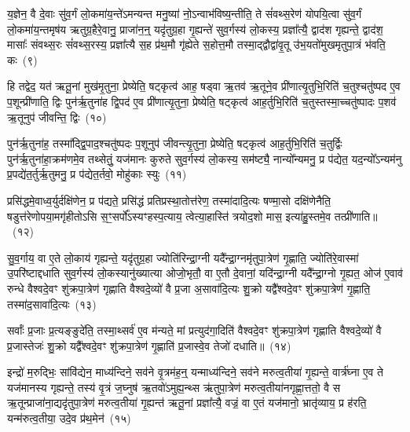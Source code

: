 {\anuvakamend[{ध्रु॒वस्तस्मा॑दे॒व य॒ज्ञस्यैका॒न्नच॑त्वारि॒ꣳ॒शच्च॑}]}

य॒ज्ञेन॒ वै दे॒वाः सु॑व॒र्गं लो॒कमा॑य॒न्ते॑\-ऽमन्यन्त मनु॒ष्या॑ नो॒\-ऽन्वाभ॑विष्य॒न्तीति॒ ते सं॑वथ्स॒रेण॑ योपयि॒त्वा सु॑व॒र्गं लो॒कमा॑य॒न्तमृष॑य ऋतुग्र॒हैरे॒वानु॒ प्राजा॑न॒न्॒ यदृ॑तुग्र॒हा गृ॒ह्यन्ते॑ सुव॒र्गस्य॑ लो॒कस्य॒ प्रज्ञा᳚त्यै॒ द्वाद॑श गृह्यन्ते॒ द्वाद॑श॒ मासाः᳚ संवथ्स॒रः सं॑वथ्स॒रस्य॒ प्रज्ञा᳚त्यै स॒ह प्र॑थ॒मौ गृ॑ह्येते स॒होत्त॒मौ तस्मा॒द्द्वौद्वा॑वृ॒तू उ॑भ॒यतो॑मुखमृतुपा॒त्रं भ॑वति॒ कः~(९)\ip

हि तद्वेद॒ यत॑ ऋतू॒नां मुख॑मृ॒तुना॒ प्रेष्येति॒ षट्कृत्व॑ आह॒ षड्वा ऋ॒तव॑ ऋ॒तूने॒व प्री॑णात्यृ॒तुभि॒रिति॑ च॒तुश्चतु॑ष्पद ए॒व प॒शून्प्री॑णाति॒ द्विः पुन॑र्\mbox{}ऋ॒तुना॑ह द्वि॒पद॑ ए॒व प्री॑णात्यृ॒तुना॒ प्रेष्येति॒ षट्कृत्व॑ आह॒र्तुभि॒रिति॑ च॒तुस्तस्मा॒च्चतु॑ष्पादः प॒शव॑ ऋ॒तूनुप॑ जीवन्ति॒ द्विः~(१०)\ip

पुन॑र्\mbox{}ऋ॒तुना॑ह॒ तस्मा᳚द्\-द्वि॒पाद॒श्चतु॑ष्पदः प॒शूनुप॑ जीवन्त्यृ॒तुना॒ प्रेष्येति॒ षट्कृत्व॑ आह॒र्तुभि॒रिति॑ च॒तुर्द्विः पुन॑र्\mbox{}ऋ॒तुना॑हा॒क्रम॑णमे॒व तथ्सेतुं॒ यज॑मानः कुरुते सुव॒र्गस्य॑ लो॒कस्य॒ सम॑ष्ट्यै॒ नान्यो᳚न्यमनु॒ प्र प॑द्येत॒ यद॒न्यो᳚\-ऽन्यम॑नु प्र॒पद्ये॑त॒र्तुर्\mbox{}ऋ॒तुमनु॒ प्र प॑द्येत॒र्तवो॒ मोहु॑काः स्युः~(११)\ip

प्रसि॑द्धमे॒वाध्व॒र्युर्दक्षि॑णेन॒ प्र प॑द्यते॒ प्रसि॑द्धं प्रतिप्रस्था॒तोत्त॑रेण॒ तस्मा॑दादि॒त्यः षण्मा॒सो दक्षि॑णेनैति॒ षडुत्त॑रेणोपया॒मगृ॑हीतो\-ऽसि स॒ꣳ॒सर्पो᳚\-ऽस्यꣳहस्प॒त्याय॒ त्वेत्या॒हास्ति॑ त्रयोद॒शो मास॒ इत्या॑हु॒स्तमे॒व तत्प्री॑णाति॥~(१२)\ip

{\anuvakamend[{को जी॑वन्ति॒ द्विः स्यु॒श्चतु॑स्त्रिꣳशच्च}]}

सु॒व॒र्गाय॒ वा ए॒ते लो॒काय॑ गृह्यन्ते॒ यदृ॑तुग्र॒हा ज्योति॑रिन्द्रा॒ग्नी यदै᳚न्द्रा॒ग्नमृ॑तुपा॒त्रेण॑ गृ॒ह्णाति॒ ज्योति॑रे॒वास्मा॑ उ॒परि॑ष्टाद्दधाति सुव॒र्गस्य॑ लो॒कस्यानु॑ख्यात्या ओजो॒भृतौ॒ वा ए॒तौ दे॒वानां॒ यदि॑न्द्रा॒ग्नी यदै᳚न्द्रा॒ग्नो गृ॒ह्यत॒ ओज॑ ए॒वाव॑ रुन्धे वैश्वदे॒वꣳ शु॑क्रपा॒त्रेण॑ गृह्णाति वैश्वदे॒व्यो॑ वै प्र॒जा अ॒सावा॑दि॒त्यः शु॒क्रो यद्वै᳚श्वदे॒वꣳ शु॑क्रपा॒त्रेण॑ गृ॒ह्णाति॒ तस्मा॑द॒सावा॑दि॒त्यः~(१३)\ip

सर्वाः᳚ प्र॒जाः प्र॒त्यङ्ङुदे॑ति॒ तस्मा॒थ्सर्व॑ ए॒व म॑न्यते॒ मां प्रत्युद॑गा॒दिति॑ वैश्वदे॒वꣳ शु॑क्रपा॒त्रेण॑ गृह्णाति वैश्वदे॒व्यो॑ वै प्र॒जास्तेजः॑ शु॒क्रो यद्वै᳚श्वदे॒वꣳ शु॑क्रपा॒त्रेण॑ गृ॒ह्णाति॑ प्र॒जास्वे॒व तेजो॑ दधाति॥~(१४)\ip

{\anuvakamend[{तस्मा॑द॒सावा॑दि॒त्यस्त्रि॒ꣳ॒शच्च॑}]}

इन्द्रो॑ म॒रुद्भिः॒ सांवि॑द्येन॒ माध्य॑न्दिने॒ सव॑ने वृ॒त्रम॑ह॒न्॒ यन्माध्य॑न्दिने॒ सव॑ने मरुत्व॒तीया॑ गृ॒ह्यन्ते॒ वार्त्र॑घ्ना ए॒व ते यज॑मानस्य गृह्यन्ते॒ तस्य॑ वृ॒त्रं ज॒घ्नुष॑ ऋ॒तवो॑\-ऽमुह्य॒न्थ्स ऋ॑तुपा॒त्रेण॑ मरुत्व॒तीया॑नगृह्णा॒त्ततो॒ वै स ऋ॒तून्प्राजा॑ना॒द्यदृ॑तुपा॒त्रेण॑ मरुत्व॒तीया॑ गृ॒ह्यन्त॑ ऋतू॒नां प्रज्ञा᳚त्यै॒ वज्रं॒ वा ए॒तं यज॑मानो॒ भ्रातृ॑व्याय॒ प्र ह॑रति॒ यन्म॑रुत्व॒तीया॒ उदे॒व प्र॑थ॒मेन॑~(१५)\ip

